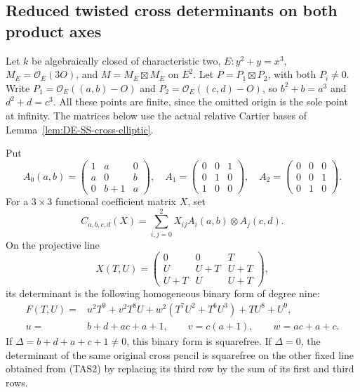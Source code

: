 \subsection{Reduced twisted cross determinants on both product axes}

Let \(k\) be algebraically closed of characteristic two,
\(E:y^2+y=x^3\), \(M_E=\mathcal O_E(3O)\), and
\(M=M_E\boxtimes M_E\) on \(E^2\).
Let \(P=P_1\boxtimes P_2\), with both \(P_i\ne0\).
Write \(P_1=\mathcal O_E((a,b)-O)\) and
\(P_2=\mathcal O_E((c,d)-O)\), so
\(b^2+b=a^3\) and \(d^2+d=c^3\).
All these points are finite, since the omitted origin is the sole
point at infinity. The matrices below use the actual relative
Cartier bases of Lemma~\ref{lem:DE-SS-cross-elliptic}.

\begin{lemma}
\label{lem:ss-product-two-axis-universal-line}
Put
\[
 A_0(a,b)=\begin{pmatrix}1&a&0\\a&0&b\\0&b+1&a\end{pmatrix},
 \quad A_1=\begin{pmatrix}0&0&1\\0&1&0\\1&0&0\end{pmatrix},
 \quad A_2=\begin{pmatrix}0&0&0\\0&0&1\\0&1&0\end{pmatrix}.
 \tag{TAS1}
\]
For a \(3\times3\) functional coefficient matrix \(X\), set
\[
 C_{a,b,c,d}(X)=\sum_{i,j=0}^2X_{ij}A_i(a,b)\otimes A_j(c,d).
\]
On the projective line
\[
 X(T,U)=\begin{pmatrix}
 0&0&T\\U&U+T&U+T\\U+T&U&U+T
 \end{pmatrix},
 \tag{TAS2}
\]
its determinant is the following homogeneous binary form of degree nine:
\[
 \begin{split}
 F(T,U)={}&u^2T^9+v^2T^8U
              +w^2(T^7U^2+T^6U^3)+TU^8+U^9,\\
 u={}&b+d+ac+a+1,\qquad v=c(a+1),\qquad w=ac+a+c.
 \end{split}
 \tag{TAS3}
\]
If \(\Delta=b+d+a+c+1\ne0\), this binary form is squarefree.
If \(\Delta=0\), the determinant of the same original cross
pencil is squarefree on the other fixed line obtained from (TAS2)
by replacing its third row by the sum of its first and third rows.
\end{lemma}
